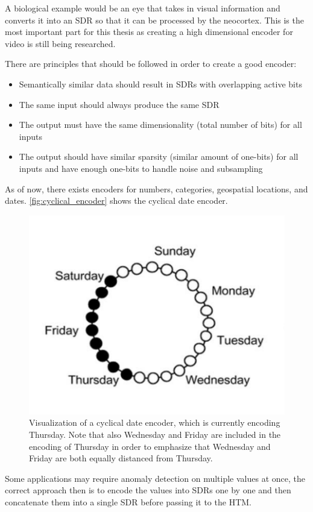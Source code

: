 A biological example would be an eye that takes in visual information and converts it into an SDR so that it can be processed by the neocortex. This is the most important part for this thesis as creating a high dimensional encoder for video is still being researched.\par
There are principles that should be followed in order to create a good encoder:
\begin{itemize}
    \item Semantically similar data should result in SDRs with overlapping active bits
    \item The same input should always produce the same SDR
    \item The output must have the same dimensionality (total number of bits) for all inputs
    \item The output should have similar sparsity (similar amount of one-bits) for all inputs and have enough one-bits to handle noise and subsampling
\end{itemize}
As of now, there exists encoders for numbers, categories, geospatial locations, and dates. \autoref{fig:cyclical_encoder} shows the cyclical date encoder.
\begin{figure}[H]
    \centering
    \includegraphics[width=0.9\linewidth]{resources/related_works/cyclical_encoder}
    \caption{Visualization of a cyclical date encoder, which is currently encoding Thursday. Note that also Wednesday and Friday are included in the encoding of Thursday in order to emphasize that Wednesday and Friday are both equally distanced from Thursday.}
    \label{fig:cyclical_encoder}
\end{figure}
Some applications may require anomaly detection on multiple values at once, the correct approach then is to encode the values into SDRs one by one and then concatenate them into a single SDR before passing it to the HTM.
